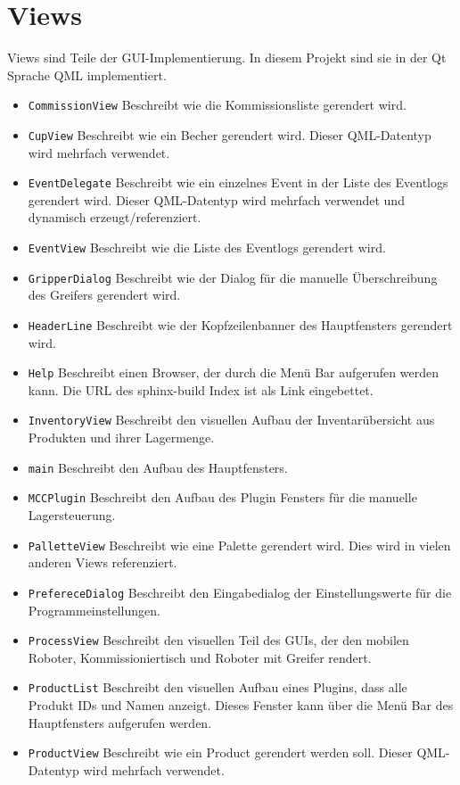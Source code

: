 \section{Views}
Views sind Teile der GUI-Implementierung. In diesem Projekt sind sie in der Qt Sprache QML implementiert.
\begin{itemize}
    \item \verb|CommissionView| Beschreibt wie die Kommissionsliste gerendert wird.
    \item \verb|CupView| Beschreibt wie ein Becher gerendert wird. Dieser QML-Datentyp wird mehrfach verwendet.
    \item \verb|EventDelegate| Beschreibt wie ein einzelnes Event in der Liste des Eventlogs gerendert wird. Dieser QML-Datentyp wird mehrfach verwendet und dynamisch erzeugt/referenziert.
    \item \verb|EventView| Beschreibt wie die Liste des Eventlogs gerendert wird.
    \item \verb|GripperDialog| Beschreibt wie der Dialog für die manuelle Überschreibung des Greifers gerendert wird.
    \item \verb|HeaderLine| Beschreibt wie der Kopfzeilenbanner des Hauptfensters gerendert wird.
    \item \verb|Help| Beschreibt einen Browser, der durch die Menü Bar aufgerufen werden kann. Die URL des sphinx-build Index ist als Link eingebettet. 
    \item \verb|InventoryView| Beschreibt den visuellen Aufbau der Inventarübersicht aus Produkten und ihrer Lagermenge.
    \item \verb|main| Beschreibt den Aufbau des Hauptfensters.
    \item \verb|MCCPlugin| Beschreibt den Aufbau des Plugin Fensters für die manuelle Lagersteuerung.
    \item \verb|PalletteView| Beschreibt wie eine Palette gerendert wird. Dies wird in vielen anderen Views referenziert. 
    \item \verb|PrefereceDialog| Beschreibt den Eingabedialog der Einstellungswerte für die Programmeinstellungen.
    \item \verb|ProcessView| Beschreibt den visuellen Teil des GUIs, der den mobilen Roboter, Kommissioniertisch und Roboter mit Greifer rendert. 
    \item \verb|ProductList| Beschreibt den visuellen Aufbau eines Plugins, dass alle Produkt IDs und Namen anzeigt. Dieses Fenster kann über die Menü Bar des Hauptfensters aufgerufen werden.
    \item \verb|ProductView| Beschreibt wie ein Product gerendert werden soll. Dieser QML-Datentyp wird mehrfach verwendet.

\end{itemize}
